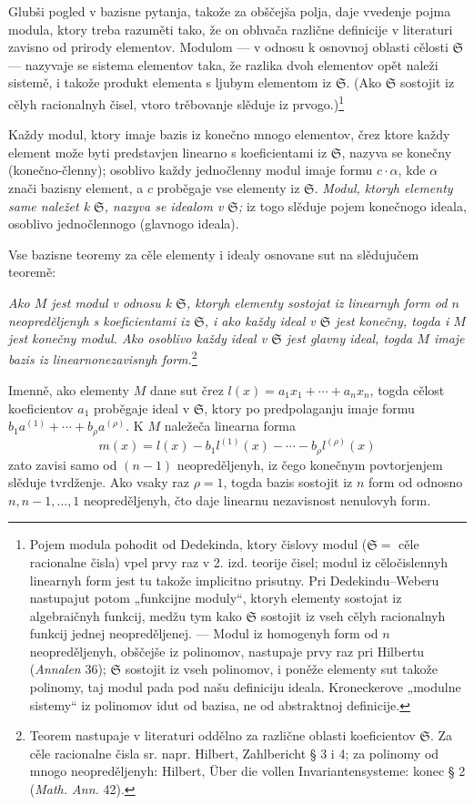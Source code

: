 \documentclass[11pt]{article}
\providecommand{\frS}{\mathfrak S}
\begin{document}
Glubši pogled v bazisne pytanja, takože za obščejša polja, daje vvedenje pojma modula, ktory treba razuměti tako, že on obhvača različne definicije v literaturi zavisno od prirody elementov. Modulom --- v odnosu k osnovnoj oblasti cělosti \(\frS\) --- nazyvaje se sistema elementov taka, že razlika dvoh elementov opět naleži sistemě, i takože produkt elementa s ljubym elementom iz \(\frS\). (Ako \(\frS\) sostojit iz cělyh racionalnyh čisel, vtoro trěbovanje slěduje iz prvogo.)\footnote{Pojem modula pohodit od Dedekinda, ktory čislovy modul (\(\frS=\) cěle racionalne čisla) vpel prvy raz v 2. izd. teorije čisel; modul iz cěločislennyh linearnyh form jest tu takože implicitno prisutny. Pri Dedekindu--Weberu nastupajut potom „funkcijne moduly“, ktoryh elementy sostojat iz algebraičnyh funkcij, medžu tym kako \(\frS\) sostojit iz vseh cělyh racionalnyh funkcij jednej neopreděljenej. --- Modul iz homogenyh form od \(n\) neopreděljenyh, obščejše iz polinomov, nastupaje prvy raz pri Hilbertu (\emph{Annalen} 36); \(\frS\) sostojit iz vseh polinomov, i poněže elementy sut takože polinomy, taj modul pada pod našu definiciju ideala. Kroneckerove „modulne sistemy“ iz polinomov idut od bazisa, ne od abstraktnoj definicije.}

Každy modul, ktory imaje bazis iz konečno mnogo elementov, črez ktore každy element može byti predstavjen linearno s koeficientami iz \(\frS\), nazyva se konečny (konečno-členny); osoblivo každy jednočlenny modul imaje formu \(c\cdot\alpha\), kde \(\alpha\) znači bazisny element, a \(c\) proběgaje vse elementy iz \(\frS\). {\itshape Modul, ktoryh elementy same naležet k \(\frS\), nazyva se idealom v \(\frS\);} iz togo slěduje pojem konečnogo ideala, osoblivo jednočlennogo (glavnogo ideala).

Vse bazisne teoremy za cěle elementy i idealy osnovane sut na slědujučem teoremě:

{\itshape Ako \(M\) jest modul v odnosu k \(\frS\), ktoryh elementy sostojat iz linearnyh form od \(n\) neopreděljenyh s koeficientami iz \(\frS\), i ako každy ideal v \(\frS\) jest konečny, togda i \(M\) jest konečny modul. Ako osoblivo každy ideal v \(\frS\) jest glavny ideal, togda \(M\) imaje bazis iz linearnonezavisnyh form.}\footnote{Teorem nastupaje v literaturi oddělno za različne oblasti koeficientov \(\frS\). Za cěle racionalne čisla sr. napr. Hilbert, Zahlbericht § 3 i 4; za polinomy od mnogo neopreděljenyh: Hilbert, Über die vollen Invariantensysteme: konec § 2 (\emph{Math. Ann.} 42).}

Imenně, ako elementy \(M\) dane sut črez \(l(x)=a_1x_1+\cdots+a_nx_n\), togda cělost koeficientov \(a_1\) proběgaje ideal v \(\frS\), ktory po predpolaganju imaje formu \(b_1a^{(1)}+\cdots+b_\rho a^{(\rho)}\). K \(M\) naležeča linearna forma
\[
m(x)=l(x)-b_1l^{(1)}(x)-\cdots-b_\rho l^{(\rho)}(x)
\]
zato zavisi samo od \((n-1)\) neopreděljenyh, iz čego konečnym povtorjenjem slěduje tvrdženje. Ako vsaky raz \(\rho=1\), togda bazis sostojit iz \(n\) form od odnosno \(n,n-1,\ldots,1\) neopreděljenyh, čto daje linearnu nezavisnost nenulovyh form.
\end{document}
